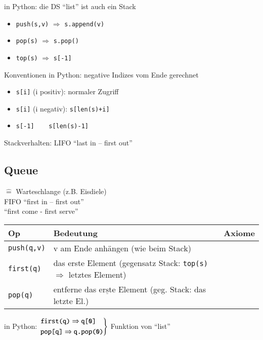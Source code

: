    in Python: die DS ``list'' ist auch ein Stack
    \begin{itemize}
        \item \verb|push(s,v)| $\Rightarrow$ \verb|s.append(v)|
        \item \verb|pop(s)| $\Rightarrow$ \verb|s.pop()|
        \item \verb|top(s)| $\Rightarrow$ \verb|s[-1]|
    \end{itemize}
    Konventionen in Python: negative Indizes vom Ende gerechnet
    \begin{itemize}[label={}]
        \item \verb|s[i]| (i positiv): normaler Zugriff
        \item \verb|s[i]| (i negativ): \verb|s[len(s)+i]|
        \item \verb|s[-1]    s[len(s)-1]|
    \end{itemize}

    Stackverhalten: LIFO ``last in – first out''

    \subsection{Queue}
    $\widehat{=}$ Warteschlange (z.B. Eisdiele) \\

    FIFO ``first in – first out'' \\
    ``first come - first serve'' \\

    \begin{tabular}{C{5cm} C{5cm} C{5cm}}
        Op & Bedeutung & Axiome \\ \hline
        \verb|push(q,v)| & v am Ende anhängen (wie beim Stack) & \\
        \verb|first(q)| & das erste Element (gegensatz Stack: \verb|top(s)| $\Rightarrow$ letztes Element) & \\
        \verb|pop(q)| & entferne das $\underline{\text{erste}}$ Element (geg. Stack: das letzte El.) & \\ \hline
    \end{tabular}

    in Python:
    $\begin{rcases}
        \verb|first(q)| \Rightarrow \verb|q[0]| \\
        \verb|pop[q]| \Rightarrow \verb|q.pop(0)|
        \end{rcases}$
        Funktion von ``list'' \\

